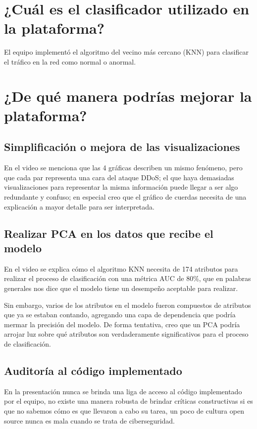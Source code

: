 \documentclass{article}
\begin{document}
    \section{¿Cuál es el clasificador utilizado en la plataforma?}
        El equipo implementó el algoritmo del vecino más cercano (KNN) para clasificar el tráfico en la red como normal o anormal.
    
    \section{¿De qué manera podrías mejorar la plataforma?}
    
    
        \subsection{Simplificación o mejora de las visualizaciones}
            
            En el video se menciona que las 4 gráficas describen un mismo fenómeno, pero que cada par representa una cara del ataque DDoS; el que haya demasiadas visualizaciones para representar la misma información puede llegar a ser algo redundante y confuso; en especial creo que el gráfico de cuerdas necesita de una explicación a mayor detalle para ser interpretada.

        \subsection{Realizar PCA en los datos que recibe el modelo}
        
            En el video se explica cómo el algoritmo KNN necesita de 174 atributos para realizar el proceso de clasificación con una métrica AUC de 80\%, que en palabras generales nos dice que el modelo tiene un desempeño aceptable para realizar. 

            Sin embargo, varios de los atributos en el modelo fueron compuestos de atributos que ya se estaban contando, agregando una capa de dependencia que podría mermar la precisión del modelo. De forma tentativa, creo que un PCA podría arrojar luz sobre qué atributos son verdaderamente significativos para el proceso de clasificación.
        
        \subsection{Auditoría al código implementado}
            
            En la presentación nunca se brinda una liga de acceso al código implementado por el equipo, no existe una manera robusta de brindar críticas constructivas si es que no sabemos cómo es que llevaron a cabo su tarea, un poco de cultura open source nunca es mala cuando se trata de ciberseguridad.

    
    
\end{document}
